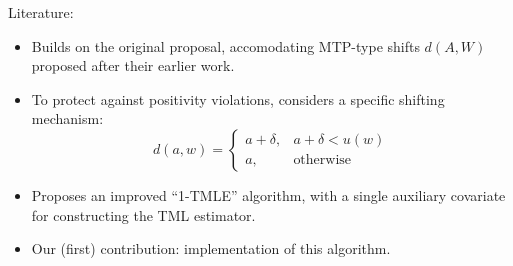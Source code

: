 \documentclass{beamer}
\begin{document}

\begin{frame}[c]{Literature: \cite{diaz2018stochastic}}

\begin{center}
\begin{itemize}
  \itemsep10pt
  \item Builds on the original proposal, accomodating MTP-type shifts $d(A,W)$
    proposed after their earlier work.
  \item To protect against positivity violations, considers a specific shifting
    mechanism:
     \begin{equation*}\label{shift_intervention}
       d(a, w) =
         \begin{cases}
           a + \delta, & a + \delta < u(w) \\
           a, & \text{otherwise}
         \end{cases}
     \end{equation*}
  \item Proposes an improved ``1-TMLE'' algorithm, with a single auxiliary
    covariate for constructing the TML estimator.
  \item Our (first) contribution: implementation of this algorithm.
\end{itemize}
\end{center}

\note{
}

\end{frame}

\end{document}
